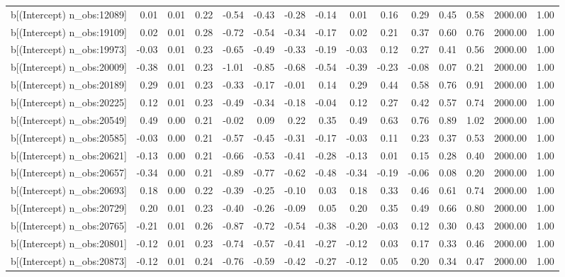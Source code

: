 \begin{table}[ht]
\begin{tabular}{rrrrrrrrrrrrrrr}
  b[(Intercept) n\_obs:12089] & 0.01 & 0.01 & 0.22 & -0.54 & -0.43 & -0.28 & -0.14 & 0.01 & 0.16 & 0.29 & 0.45 & 0.58 & 2000.00 & 1.00 \\ 
  b[(Intercept) n\_obs:19109] & 0.02 & 0.01 & 0.28 & -0.72 & -0.54 & -0.34 & -0.17 & 0.02 & 0.21 & 0.37 & 0.60 & 0.76 & 2000.00 & 1.00 \\ 
  b[(Intercept) n\_obs:19973] & -0.03 & 0.01 & 0.23 & -0.65 & -0.49 & -0.33 & -0.19 & -0.03 & 0.12 & 0.27 & 0.41 & 0.56 & 2000.00 & 1.00 \\ 
  b[(Intercept) n\_obs:20009] & -0.38 & 0.01 & 0.23 & -1.01 & -0.85 & -0.68 & -0.54 & -0.39 & -0.23 & -0.08 & 0.07 & 0.21 & 2000.00 & 1.00 \\ 
  b[(Intercept) n\_obs:20189] & 0.29 & 0.01 & 0.23 & -0.33 & -0.17 & -0.01 & 0.14 & 0.29 & 0.44 & 0.58 & 0.76 & 0.91 & 2000.00 & 1.00 \\ 
  b[(Intercept) n\_obs:20225] & 0.12 & 0.01 & 0.23 & -0.49 & -0.34 & -0.18 & -0.04 & 0.12 & 0.27 & 0.42 & 0.57 & 0.74 & 2000.00 & 1.00 \\ 
  b[(Intercept) n\_obs:20549] & 0.49 & 0.00 & 0.21 & -0.02 & 0.09 & 0.22 & 0.35 & 0.49 & 0.63 & 0.76 & 0.89 & 1.02 & 2000.00 & 1.00 \\ 
  b[(Intercept) n\_obs:20585] & -0.03 & 0.00 & 0.21 & -0.57 & -0.45 & -0.31 & -0.17 & -0.03 & 0.11 & 0.23 & 0.37 & 0.53 & 2000.00 & 1.00 \\ 
  b[(Intercept) n\_obs:20621] & -0.13 & 0.00 & 0.21 & -0.66 & -0.53 & -0.41 & -0.28 & -0.13 & 0.01 & 0.15 & 0.28 & 0.40 & 2000.00 & 1.00 \\ 
  b[(Intercept) n\_obs:20657] & -0.34 & 0.00 & 0.21 & -0.89 & -0.77 & -0.62 & -0.48 & -0.34 & -0.19 & -0.06 & 0.08 & 0.20 & 2000.00 & 1.00 \\ 
  b[(Intercept) n\_obs:20693] & 0.18 & 0.00 & 0.22 & -0.39 & -0.25 & -0.10 & 0.03 & 0.18 & 0.33 & 0.46 & 0.61 & 0.74 & 2000.00 & 1.00 \\ 
  b[(Intercept) n\_obs:20729] & 0.20 & 0.01 & 0.23 & -0.40 & -0.26 & -0.09 & 0.05 & 0.20 & 0.35 & 0.49 & 0.66 & 0.80 & 2000.00 & 1.00 \\ 
  b[(Intercept) n\_obs:20765] & -0.21 & 0.01 & 0.26 & -0.87 & -0.72 & -0.54 & -0.38 & -0.20 & -0.03 & 0.12 & 0.30 & 0.43 & 2000.00 & 1.00 \\ 
  b[(Intercept) n\_obs:20801] & -0.12 & 0.01 & 0.23 & -0.74 & -0.57 & -0.41 & -0.27 & -0.12 & 0.03 & 0.17 & 0.33 & 0.46 & 2000.00 & 1.00 \\ 
  b[(Intercept) n\_obs:20873] & -0.12 & 0.01 & 0.24 & -0.76 & -0.59 & -0.42 & -0.27 & -0.12 & 0.05 & 0.20 & 0.34 & 0.47 & 2000.00 & 1.00 \\ 

\end{tabular}
\end{table}
